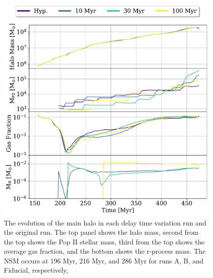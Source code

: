 \documentclass[fleqn,usenatbib]{mnras}
\begin{document}
\begin{figure} 
	\includegraphics[width=\columnwidth]{plots/time_evolution.pdf}
	\caption[The halo mass, Pop II stellar mass, gas fraction, and r-process mass as a function of time for each delay time variation run.]{The evolution of the main halo in each delay time variation run and the original run. The top panel shows the halo mass, second from the top shows the Pop II stellar mass, third from the top shows the average gas fraction, and the bottom shows the r-process mass. The NSM occurs at 196 Myr, 216 Myr, and 286 Myr for runs A, B, and Fiducial, respectively,}
	\label{fig:time_evol}
\end{figure}
\end{document}
